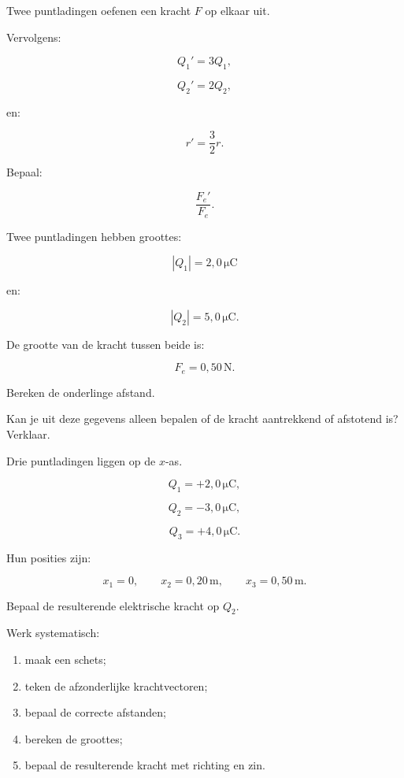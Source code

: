 \documentclass{ximera}
\begin{document}
\begin{oefening}{\oefU\ESS}

Twee puntladingen oefenen een kracht $F$ op elkaar uit.

Vervolgens:

\[
Q_1'=3Q_1,
\]

\[
Q_2'=2Q_2,
\]

en:

\[
r'=\frac32r.
\]

Bepaal:

\[
\frac{F_e'}{F_e}.
\]

\end{oefening}


\begin{oefening}{\oefU\ESS}

Twee puntladingen hebben groottes:

\[
|Q_1|=2{,}0\,\mathrm{\mu C}
\]

en:

\[
|Q_2|=5{,}0\,\mathrm{\mu C}.
\]

De grootte van de kracht tussen beide is:

\[
F_e=0{,}50\,\mathrm N.
\]

Bereken de onderlinge afstand.

Kan je uit deze gegevens alleen bepalen of de kracht aantrekkend of
afstotend is? Verklaar.

\end{oefening}


\begin{oefening}{\oefU\ESS}

Drie puntladingen liggen op de $x$-as.

\[
Q_1=+2{,}0\,\mathrm{\mu C},
\]

\[
Q_2=-3{,}0\,\mathrm{\mu C},
\]

\[
Q_3=+4{,}0\,\mathrm{\mu C}.
\]

Hun posities zijn:

\[
x_1=0,
\qquad
x_2=0{,}20\,\mathrm m,
\qquad
x_3=0{,}50\,\mathrm m.
\]

Bepaal de resulterende elektrische kracht op $Q_2$.

Werk systematisch:

\begin{enumerate}
  \item maak een schets;
  \item teken de afzonderlijke krachtvectoren;
  \item bepaal de correcte afstanden;
  \item bereken de groottes;
  \item bepaal de resulterende kracht met richting en zin.
\end{enumerate}

\end{oefening}
\end{document}
